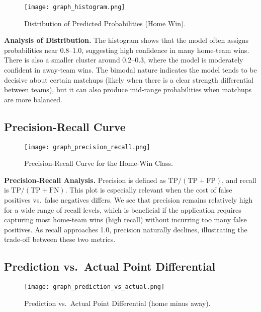 \documentclass[12pt]{article}
\begin{document}
\begin{figure}[H]
\centering
\texttt{[image: graph\_histogram.png]}
\caption{Distribution of Predicted Probabilities (Home Win).}
\label{fig:distribution_predictions}
\end{figure}

\noindent
\textbf{Analysis of Distribution.}
The histogram shows that the model often assigns probabilities near 0.8--1.0, suggesting high confidence in many home-team wins. There is also a smaller cluster around 0.2--0.3, where the model is moderately confident in away-team wins. The bimodal nature indicates the model tends to be decisive about certain matchups (likely when there is a clear strength differential between teams), but it can also produce mid-range probabilities when matchups are more balanced.

\subsection{Precision-Recall Curve}

\begin{figure}[H]
\centering
\texttt{[image: graph\_precision\_recall.png]}
\caption{Precision-Recall Curve for the Home-Win Class.}
\label{fig:precision_recall}
\end{figure}

\noindent
\textbf{Precision-Recall Analysis.}
Precision is defined as \(\text{TP} / (\text{TP} + \text{FP})\), and recall is \(\text{TP} / (\text{TP} + \text{FN})\). This plot is especially relevant when the cost of false positives vs.\ false negatives differs. We see that precision remains relatively high for a wide range of recall levels, which is beneficial if the application requires capturing most home-team wins (high recall) without incurring too many false positives. As recall approaches 1.0, precision naturally declines, illustrating the trade-off between these two metrics.

\subsection{Prediction vs.\ Actual Point Differential}

\begin{figure}[H]
\centering
\texttt{[image: graph\_prediction\_vs\_actual.png]}
\caption{Prediction vs.\ Actual Point Differential (home minus away).}
\label{fig:prediction_vs_actual}
\end{figure}
\end{document}
